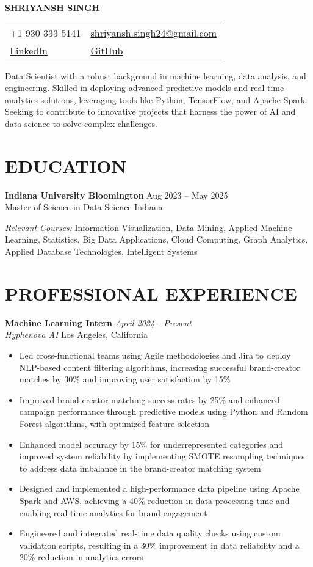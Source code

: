 \documentclass[12pt,a4paper]{article}
\newcommand{\cvitem}[4]{
  \textbf{#1} \hfill #2 \\
  #3 \hfill #4 \par\vspace{-0.5em} %
}
\newcommand{\workexp}[4]{
  \textbf{#1} \hfill \textit{#2}\\
  \textit{#3} \hfill #4\\
  \vspace{-1em} %
}
\begin{document}
\begin{center}
\textbf{\LARGE SHRIYANSH SINGH}\\
\normalsize
\begin{tabular}{>{\raggedright}p{} >{\raggedleft}p{}}
+1 930 333 5141 & \href{mailto:shriyansh.singh24@gmail.com}{shriyansh.singh24@gmail.com} \\
\href{https://www.linkedin.com/in/shriyansh-bir-singh}{LinkedIn} & \href{https://github.com/shriyansh24}{GitHub} \\
\end{tabular}
\end{center}

\small{Data Scientist with a robust background in machine learning, data analysis, and engineering. Skilled in deploying advanced predictive models and real-time analytics solutions, leveraging tools like Python, TensorFlow, and Apache Spark. Seeking to contribute to innovative projects that harness the power of AI and data science to solve complex challenges.}

\section*{EDUCATION}
\cvitem{Indiana University Bloomington}{Aug 2023 – May 2025}{Master of Science in Data Science}{Indiana}
\textit{Relevant Courses:} Information Visualization, Data Mining, Applied Machine Learning, Statistics, Big Data Applications, Cloud Computing, Graph Analytics, Applied Database Technologies, Intelligent Systems

\section*{PROFESSIONAL EXPERIENCE}
\workexp{Machine Learning Intern}{April 2024 - Present}{Hyphenova AI}{Los Angeles, California}
\begin{itemize}[leftmargin=*,noitemsep,topsep=0pt]
\item Led cross-functional teams using Agile methodologies and Jira to deploy NLP-based content filtering algorithms, increasing successful brand-creator matches by 30\% and improving user satisfaction by 15\%
\item Improved brand-creator matching success rates by 25\% and enhanced campaign performance through predictive models using Python and Random Forest algorithms, with optimized feature selection
\item Enhanced model accuracy by 15\% for underrepresented categories and improved system reliability by implementing SMOTE resampling techniques to address data imbalance in the brand-creator matching system
\item Designed and implemented a high-performance data pipeline using Apache Spark and AWS, achieving a 40\% reduction in data processing time and enabling real-time analytics for brand engagement
\item Engineered and integrated real-time data quality checks using custom validation scripts, resulting in a 30\% improvement in data reliability and a 20\% reduction in analytics errors
\end{itemize}
\end{document}
